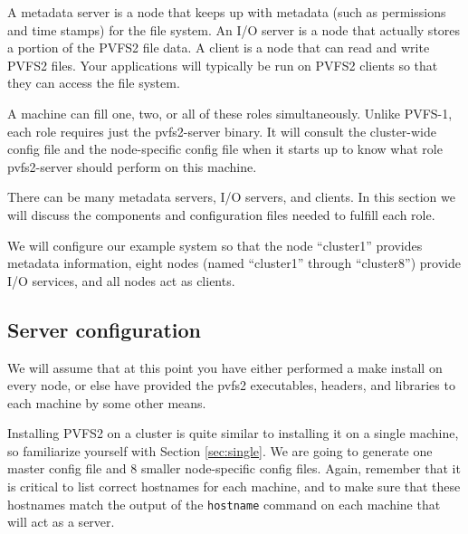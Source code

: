 \documentclass[11pt, letterpaper]{article}
\begin{document}
A metadata server is a node that keeps up with metadata (such as permissions
and time stamps) for the file system. An I/O server is a node that actually
stores a portion of the PVFS2 file data. A client is a node that can read and
write PVFS2 files. Your applications will typically be run on PVFS2 clients so
that they can access the file system.

A machine can fill one, two, or all of these roles simultaneously. Unlike
PVFS-1, each role requires just the pvfs2-server binary.  It will consult the
cluster-wide config file and the node-specific config file when it starts up to
know what role pvfs2-server should perform on this machine.

There can be many metadata servers, I/O servers, and clients. In this section
we will discuss the components and configuration files needed to fulfill each
role.

We will configure our example system so that the node ``cluster1'' provides
metadata information, eight nodes (named ``cluster1'' through ``cluster8'')
provide I/O services, and all nodes act as clients.

\subsection{Server configuration}
\label{sec:server-config}

We will assume that at this point you have either performed a make install 
on every node, or else have provided the pvfs2 executables, headers, and 
libraries to each machine by some other means.

Installing PVFS2 on a cluster is quite similar to installing it on a single
machine, so familiarize yourself with Section \ref{sec:single}.  We are going
to generate one master config file and 8 smaller node-specific config files. 
Again, remember that it is critical to list correct hostnames for each machine,
and to make sure that these hostnames match the output of the \texttt{hostname} 
command on each machine that will act as a server.
\end{document}
